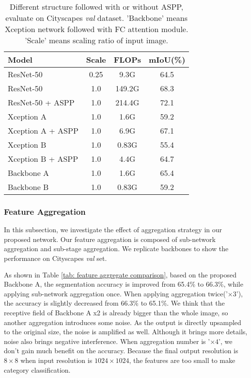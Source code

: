 \documentclass[10pt,twocolumn,letterpaper]{article}
\begin{document}
\begin{table}
\begin{center}
\begin{tabular}{l|c|c|c}
\hline
Model & Scale & FLOPs & mIoU(\%) \\
\hline\hline
ResNet-50 & 0.25 & 9.3G              & 64.5 \\
ResNet-50 & 1.0 &  149.2G             & 68.3 \\
\hline
ResNet-50 + ASPP & 1.0 & 214.4G      & 72.1 \\
\hline\hline

\hline
Xception A          & 1.0    & 1.6G         &  59.2 \\
Xception A + ASPP   & 1.0    & 6.9G         &  67.1 \\
Xception B          & 1.0    & 0.83G        &  55.4 \\
Xception B + ASPP   & 1.0    & 4.4G         &  64.7 \\ 
\hline\hline
Backbone A  & 1.0 & 1.6G    &   65.4  \\
Backbone B  & 1.0 & 0.83G   &   59.2  \\ 
\hline
\end{tabular}
\end{center}
\caption{Different structure followed with or without ASPP, evaluate on Cityscapes \textit{val} dataset. 
'Backbone' means Xception network followed with FC attention module. 'Scale' means scaling ratio of input image.}
\label{tab: backbone comparison}
\end{table}


\subsubsection{Feature Aggregation}
In this subsection, we investigate the effect of aggregation strategy in our proposed network. Our feature aggregation is composed of sub-network aggregation and sub-stage aggregation. We replicate backbones to show the performance on Cityscapes \textit{val} set.

As shown in Table \ref{tab: feature aggregate comparison}, based on the proposed Backbone A, the segmentation accuracy is improved from 65.4\% to 66.3\%, while applying sub-network aggregation once. When applying aggregation twice('$\times3$'), the accuracy is slightly decreased from 66.3\% to 65.1\%. We think that the receptive field of Backbone A x2 is already bigger than the whole image, so another aggregation introduces some noise. As the output is directly upsampled to the original size, the noise is amplified as well. Although it brings more details, noise also brings negative interference. When aggregation number is '$\times4$', we don't gain much benefit on the accuracy. Because the final output resolution is $8\times8$ when input resolution is $1024\times1024$, the features are too small to make category classification. 
\end{document}

